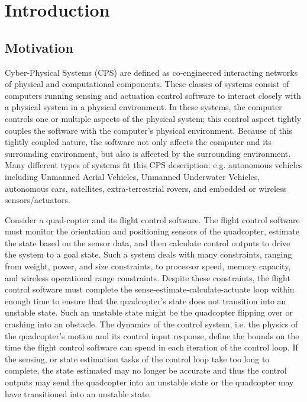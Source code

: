 \chapter{Introduction}
\label{ch:intro}

\section{Motivation}
\label{sec:motivation}

Cyber-Physical Systems (CPS) are defined as co-engineered interacting
networks of physical and computational components.  These classes of
systems consist of computers running sensing and actuation control
software to interact closely with a physical system in a physical
environment.  In these systems, the computer controls one or multiple
aspects of the physical system; this control aspect tightly couples
the software with the computer's physical environment.  Because of
this tightly coupled nature, the software not only affects the
computer and its surrounding environment, but also is affected by the
surrounding environment.  Many different types of systems fit this CPS
description: e.g. autonomous vehicles including Unmanned Aerial
Vehicles, Unmanned Underwater Vehicles, autonomous cars, satellites,
extra-terrestrial rovers, and embedded or wireless sensors/actuators.

Consider a quad-copter and its flight control software.  The flight
control software must monitor the orientation and positioning sensors
of the quadcopter, estimate the state based on the sensor data, and
then calculate control outputs to drive the system to a goal state.
Such a system deals with many constraints, ranging from weight, power,
and size constraints, to processor speed, memory capacity, and
wireless operational range constraints.  Despite these constraints,
the flight control software must complete the
sense-estimate-calculate-actuate loop within enough time to ensure
that the quadcopter's state does not transition into an unstable
state.  Such an unstable state might be the quadcopter flipping over
or crashing into an obstacle.  The dynamics of the control system,
i.e. the physics of the quadcopter's motion and its control input
response, define the bounds on the time the flight control software
can spend in each iteration of the control loop.  If the sensing, or
state estimation tasks of the control loop take too long to complete,
the state estimated may no longer be accurate and thus the control
outputs may send the quadcopter into an unstable state or the
quadcopter may have transitioned into an unstable state.

